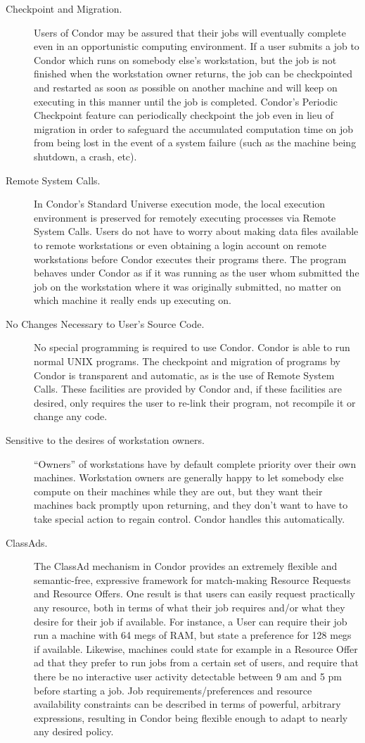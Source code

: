 \begin{description}
	\item[Checkpoint and Migration.] Users of Condor may be assured that
their jobs will eventually complete even in an opportunistic computing
environment. If a user submits a job to Condor which runs on somebody
else's workstation, but the job is not finished when the workstation
owner returns, the job can be checkpointed and restarted as soon as
possible on another machine and will keep on executing in this manner
until the job is completed. Condor's Periodic Checkpoint feature can
periodically checkpoint the job even in lieu of migration in order to
safeguard the accumulated computation time on job from being lost in the
event of a system failure (such as the machine being shutdown, a crash,
etc). 
	\item[Remote System Calls.] In Condor's Standard Universe execution
mode, the local execution environment is preserved for remotely
executing processes via Remote System Calls. Users do not have to worry
about making data files available to remote workstations or even
obtaining a login account on remote workstations before Condor executes
their programs there. The program behaves under Condor as if it was
running as the user whom submitted the job on the workstation where it
was originally submitted, no matter on which machine it really ends up
executing on.
	\item[No Changes Necessary to User's Source Code.] No special programming
is required to use Condor. Condor is able to run normal UNIX programs.
The checkpoint and migration of programs by Condor is transparent and
automatic, as is the use of Remote System Calls.  These facilities are
provided by Condor
and, if these facilities are desired, only requires the user to re-link
their program, not recompile it or change any code.
	\item[Sensitive to the desires of workstation owners.] ``Owners'' of
workstations have by default complete priority over their own machines.
Workstation owners are generally happy to let somebody else compute on
their machines while they are out, but they want their machines back
promptly upon returning, and they don't want to have to take special
action to regain control. Condor handles this automatically. 
	\item[ClassAds.]The ClassAd mechanism in Condor provides an extremely
flexible and semantic-free, expressive framework for match-making
Resource Requests and Resource Offers. One result is that users can
easily request practically any resource, both in terms of what their job
requires and/or what they desire for their job if available. For
instance, a User can require their job run a machine with 64 megs of
RAM, but state a preference for 128 megs if available. Likewise, machines
could state for example in a Resource Offer ad that they prefer to run jobs
from a certain set of users, and require that there be no interactive user
activity detectable between 9 am and 5 pm before starting a job.  Job
requirements/preferences and resource availability constraints can be
described in terms of powerful, arbitrary expressions, resulting in
Condor being flexible enough to adapt to nearly any desired policy. 
\end{description}

